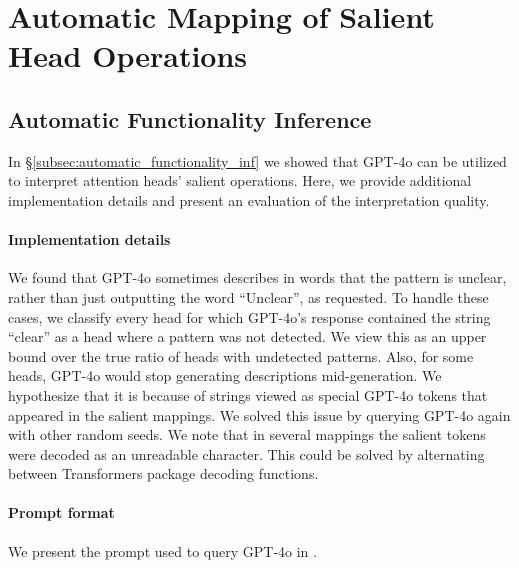 \documentclass[11pt]{article}
\newcommand{\GPTFourO}{GPT-4o}
\begin{document}
\section{Automatic Mapping of Salient Head Operations}
\label{appendix:automatic_mapping}

\subsection{Automatic Functionality Inference}
In \S\ref{subsec:automatic_functionality_inf} we showed that \GPTFourO{} can be utilized to interpret attention heads' salient operations. Here, we provide additional implementation details and present an evaluation of the interpretation quality.

\paragraph{Implementation details}
We found that \GPTFourO{} sometimes describes in words that the pattern is unclear, rather than just outputting the word ``Unclear'', as requested. To handle these cases, we classify every head for which \GPTFourO{}'s response contained the string ``clear'' as a head where a pattern was not detected. We view this as an upper bound over the true ratio of heads with undetected patterns. 
Also, for some heads, \GPTFourO{} would stop generating descriptions mid-generation. We hypothesize that it is because of strings viewed as special \GPTFourO{} tokens that appeared in the salient mappings. We solved this issue by querying \GPTFourO{} again with other random seeds.
We note that in several mappings the salient tokens were decoded as an unreadable character. This could be solved by alternating between Transformers package \cite{wolf2019transformers} decoding functions.

\paragraph{Prompt format} We present the prompt used to query \GPTFourO{} in .
\end{document}
